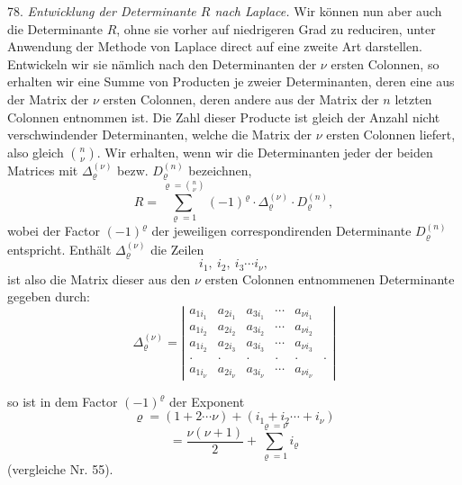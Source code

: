 \documentclass[11pt]{article}
\providecommand{\weberpage}[1]{}
\begin{document}
78. \textit{Entwicklung der Determinante $R$ nach Laplace.} Wir k\"onnen
nun aber auch die Determinante $R$, ohne sie vorher auf niedrigeren Grad zu
reduciren, unter Anwendung der Methode von Laplace direct auf eine zweite
Art darstellen. Entwickeln wir sie n\"amlich nach den Determinanten der $\nu$
ersten Colonnen, so erhalten wir eine Summe von Producten je zweier
Determinanten, deren eine aus der Matrix der $\nu$ ersten Colonnen, deren
andere aus der Matrix der $n$ letzten Colonnen entnommen ist. Die Zahl
dieser Producte ist gleich der Anzahl nicht verschwindender Determinanten,
welche die Matrix der $\nu$ ersten Colonnen liefert, also gleich
$\binom{n}{\nu}$. Wir erhalten, wenn wir die Determinanten jeder der
beiden Matrices mit $\varDelta_\varrho^{(\nu)}$ bezw. $D_\varrho^{(n)}$ bezeichnen,
\[
R=\sum_{\varrho=1}^{\varrho=\binom{n}{\nu}}(-1)^\varrho\cdot\varDelta_\varrho^{(\nu)}\cdot D_\varrho^{(n)}, \tag{A}
\]
wobei der Factor $(-1)^\varrho$ der jeweiligen correspondirenden Determinante
$D_\varrho^{(n)}$ entspricht. Enth\"alt $\varDelta_\varrho^{(\nu)}$ die Zeilen
\[
i_1,\ i_2,\ i_3\cdots i_\nu,
\]
ist also die Matrix dieser aus den $\nu$ ersten Colonnen entnommenen
Determinante gegeben durch:
\[
\varDelta_\varrho^{(\nu)}=
\left|\begin{array}{cccccc}
a_{1i_1} & a_{2i_1} & a_{3i_1} & \cdots & a_{\nu i_1}\\
a_{1i_2} & a_{2i_2} & a_{3i_2} & \cdots & a_{\nu i_2}\\
a_{1i_2} & a_{2i_3} & a_{3i_3} & \cdots & a_{\nu i_3}\\
\cdot & \cdot & \cdot & \cdot & \cdot & \cdot\\
a_{1i_\nu} & a_{2i_\nu} & a_{3i_\nu} & \cdots & a_{\nu i_\nu}
\end{array}\right| \tag{B}
\]


\weberpage{83}

so ist in dem Factor $(-1)^\varrho$ der Exponent
\[
\varrho=(1+2\cdots\nu)+(i_1+i_2\cdots+i_\nu)
\]
\[
=\frac{\nu(\nu+1)}{2}+\sum_{\varrho=1}^{\varrho=\nu}i_\varrho \tag{C}
\]
(vergleiche Nr. 55).
\end{document}
